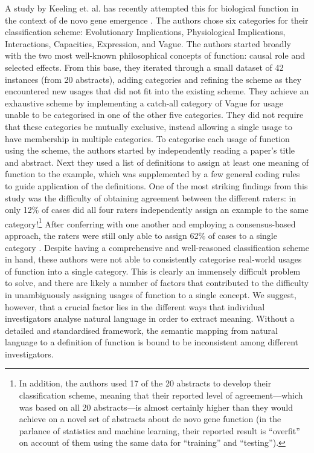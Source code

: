 \documentclass{article}
\begin{document}
A study by Keeling et. al. has recently attempted this for biological function in the context of de novo gene emergence \cite{keeling2019} .
The authors chose six categories for their classification scheme: Evolutionary Implications, Physiological Implications, Interactions, Capacities, Expression, and Vague.
The authors started broadly with the two most well-known philosophical concepts of function: causal role and selected effects.
From this base, they iterated through a small dataset of 42 instances (from 20 abstracts), adding categories and refining the scheme as they encountered new usages that did not fit into the existing scheme.
They achieve an exhaustive scheme by implementing a catch-all category of Vague for usage unable to be categorised in one of the other five categories.
They did not require that these categories be mutually exclusive, instead allowing a single usage to have membership in multiple categories.
To categorise each usage of function using the scheme, the authors started by independently reading a paper's title and abstract.
Next they used a list of definitions to assign at least one meaning of function to the example, which was supplemented by a few general coding rules to guide application of the definitions.
One of the most striking findings from this study was the difficulty of obtaining agreement between the different raters: in only 12\% of cases did all four raters independently assign an example to the same category!\footnote{In addition, the authors used 17 of the 20 abstracts to develop their classification scheme, meaning that their reported level of agreement---which was based on all 20 abstracts---is almost certainly higher than they would achieve on a novel set of abstracts about de novo gene function (in the parlance of statistics and machine learning, their reported result is ``overfit'' on account of them using the same data for ``training'' and ``testing'').}
After conferring with one another and employing a consensus-based approach, the raters were still only able to assign 62\% of cases to a single category \cite{keeling2019} .
Despite having a comprehensive and well-reasoned classification scheme in hand, these authors were not able to consistently categorise real-world usages of function into a single category.
This is clearly an immensely difficult problem to solve, and there are likely a number of factors that contributed to the difficulty in unambiguously assigning usages of function to a single concept.
We suggest, however, that a crucial factor lies in the different ways that individual investigators analyse natural language in order to extract meaning.
Without a detailed and standardised framework, the semantic mapping from natural language to a definition of function is bound to be inconsistent among different investigators.
\end{document}
